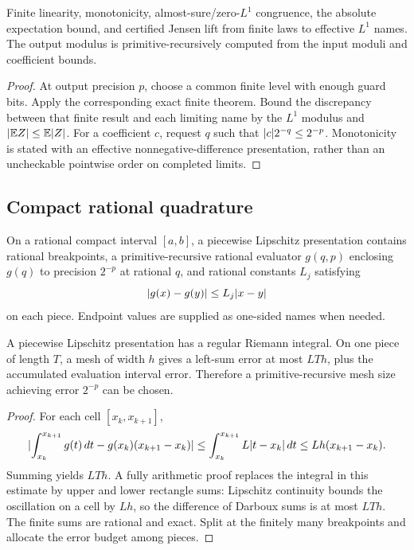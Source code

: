 \begin{theorem}\label{thm:l1-algebra}
Finite linearity, monotonicity, almost-sure/zero-\(L^1\) congruence, the absolute
expectation bound, and certified Jensen lift from finite laws to effective
\(L^1\) names.  The output modulus is primitive-recursively computed from the
input moduli and coefficient bounds.
\end{theorem}

\begin{proof}
At output precision \(p\), choose a common finite level with enough guard bits.
Apply the corresponding exact finite theorem.  Bound the discrepancy between
that finite result and each limiting name by the \(L^1\) modulus and
\(\lvert \mathbb E Z\rvert\le\mathbb E\lvert Z\rvert\).  For a coefficient \(c\), request \(q\) such that
\(\lvert c\rvert2^{-q}\le2^{-p}\).  Monotonicity is stated with an effective
nonnegative-difference presentation, rather than an uncheckable pointwise
order on completed limits.
\end{proof}

\subsection{Compact rational quadrature}

\begin{definition}\label{def:lipschitz}
On a rational compact interval \([a,b]\), a piecewise Lipschitz presentation
contains rational breakpoints, a primitive-recursive rational evaluator
\(g(q,p)\) enclosing \(g(q)\) to precision \(2^{-p}\) at rational \(q\), and
rational constants \(L_j\) satisfying
\[
 \lvert g(x)-g(y)\rvert\le L_j\lvert x-y\rvert
\]
on each piece.  Endpoint values are supplied as one-sided names when needed.
\end{definition}

\begin{theorem}\label{thm:compact-integral}
A piecewise Lipschitz presentation has a regular Riemann integral.  On one
piece of length \(T\), a mesh of width \(h\) gives a left-sum error at most
\(LTh\), plus the accumulated evaluation interval error.  Therefore a
primitive-recursive mesh size achieving error \(2^{-p}\) can be chosen.
\end{theorem}

\begin{proof}
For each cell \([x_k,x_{k+1}]\),
\[
 \lvert \int_{x_k}^{x_{k+1}}g(t)\,dt-g(x_k)(x_{k+1}-x_k)\rvert
 \le\int_{x_k}^{x_{k+1}}L\lvert t-x_k\rvert\,dt
 \le Lh(x_{k+1}-x_k).
\]
Summing yields \(LTh\).  A fully arithmetic proof replaces the integral in
this estimate by upper and lower rectangle sums: Lipschitz continuity bounds
the oscillation on a cell by \(Lh\), so the difference of Darboux sums is at
most \(LTh\).  The finite sums are rational and exact.  Split at the finitely
many breakpoints and allocate the error budget among pieces.
\end{proof}

